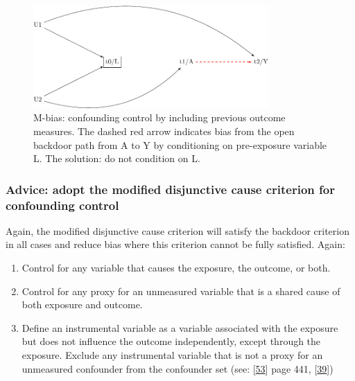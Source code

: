 \documentclass[
  singlecolumn]{article}
\providecommand{\tightlist}{%
  \setlength{\itemsep}{0pt}\setlength{\parskip}{0pt}}\usepackage{longtable,booktabs,array}
\begin{document}
\begin{figure}

{\centering \includegraphics[width=0.8\textwidth,height=\textheight]{causal-dags_files/figure-pdf/fig-m-bias-1.pdf}

}

\caption{\label{fig-m-bias}M-bias: confounding control by including
previous outcome measures. The dashed red arrow indicates bias from the
open backdoor path from A to Y by conditioning on pre-exposure variable
L. The solution: do not condition on L.}

\end{figure}

\hypertarget{advice-adopt-the-modified-disjunctive-cause-criterion-for-confounding-control}{%
\subsubsection{Advice: adopt the modified disjunctive cause criterion
for confounding
control}\label{advice-adopt-the-modified-disjunctive-cause-criterion-for-confounding-control}}

Again, the modified disjunctive cause criterion will satisfy the
backdoor criterion in all cases and reduce bias where this criterion
cannot be fully satisfied. Again:

\begin{enumerate}
\def\labelenumi{\alph{enumi}.}
\tightlist
\item
  Control for any variable that causes the exposure, the outcome, or
  both.
\item
  Control for any proxy for an unmeasured variable that is a shared
  cause of both exposure and outcome.
\item
  Define an instrumental variable as a variable associated with the
  exposure but does not influence the outcome independently, except
  through the exposure. Exclude any instrumental variable that is not a
  proxy for an unmeasured confounder from the confounder set (see:
  {[}\protect\hyperlink{ref-vanderweele2020}{53}{]} page 441,
  {[}\protect\hyperlink{ref-vanderweele2019}{39}{]})
\end{enumerate}
\end{document}
